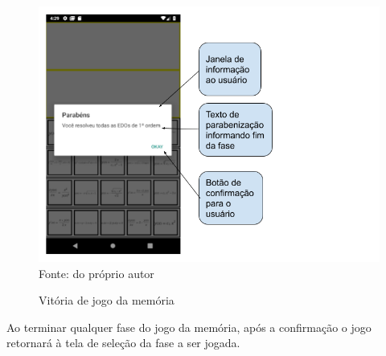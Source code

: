 \begin{figure}[H]
\centering
\caption{Vitória de jogo da memória}
\includegraphics[scale=0.72]{figuras/resolucao_fim.png}
\small{Fonte: do próprio autor}
\end{figure}

Ao terminar qualquer fase do jogo da memória, após a confirmação o jogo retornará à tela de seleção da fase a ser jogada.

